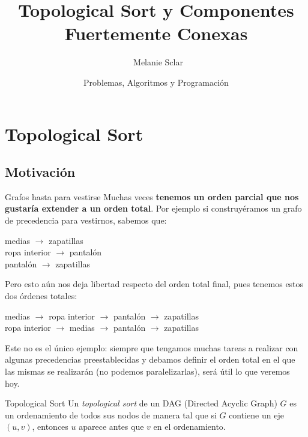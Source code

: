 \documentclass[compress]{beamer}
\title[Topological Sort y SCC] %
{Topological Sort y Componentes Fuertemente Conexas}
\author[Melanie Sclar] %
{~Melanie Sclar}
\institute[UBA] %
{
  Facultad de Ciencias Exactas y Naturales\\
  Universidad de Buenos Aires
}
\date[PAP] %
{Problemas, Algoritmos y Programación}
\begin{document}
\begin{frame}
  \titlepage
\end{frame}

\section{Topological Sort}
\subsection{Motivación}
\begin{frame}{Grafos hasta para vestirse}
Muchas veces \textbf{tenemos un orden parcial que nos gustaría extender a un orden
total}. Por ejemplo si construyéramos un grafo de precedencia para vestirnos, sabemos que: \\
\bigskip

medias $\rightarrow$ zapatillas \\
ropa interior $\rightarrow$ pantalón \\
pantalón $\rightarrow$ zapatillas \\

\bigskip

Pero esto aún nos deja libertad respecto del orden total final, 
pues tenemos estos dos órdenes totales: \\
\bigskip

medias $\rightarrow$ ropa interior $\rightarrow$ pantalón $\rightarrow$ zapatillas \\
ropa interior $\rightarrow$ medias $\rightarrow$ pantalón $\rightarrow$ zapatillas

\end{frame}

\begin{frame}

Este no es el único ejemplo: siempre que tengamos muchas tareas a realizar
con algunas precedencias preestablecidas y debamos definir el orden total
en el que las mismas se realizarán (no podemos paralelizarlas), será útil
lo que veremos hoy. \\

\bigskip

\begin{block}{Topological Sort}
Un \textit{topological sort} de un DAG (Directed Acyclic Graph) $G$ 
es un ordenamiento de todos sus nodos de manera tal que si $G$ contiene
un eje $(u, v)$, entonces $u$ aparece antes que $v$ en el ordenamiento.
\end{block}

\end{frame}
\end{document}
